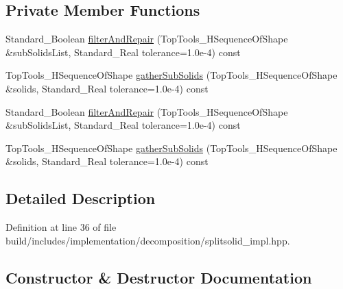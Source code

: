 \subsection*{Private Member Functions}
\begin{DoxyCompactItemize}
\item 
Standard\+\_\+\+Boolean \hyperlink{classMcCAD_1_1Decomposition_1_1SplitSolid_1_1Impl_ab12750fdedddaba9cbb2c953e82755da}{filter\+And\+Repair} (Top\+Tools\+\_\+\+H\+Sequence\+Of\+Shape \&sub\+Solids\+List, Standard\+\_\+\+Real tolerance=1.\+0e-\/4) const
\item 
Top\+Tools\+\_\+\+H\+Sequence\+Of\+Shape \hyperlink{classMcCAD_1_1Decomposition_1_1SplitSolid_1_1Impl_a18b18ada23d0b1c722679d7c30f1b391}{gather\+Sub\+Solids} (Top\+Tools\+\_\+\+H\+Sequence\+Of\+Shape \&solids, Standard\+\_\+\+Real tolerance=1.\+0e-\/4) const
\item 
Standard\+\_\+\+Boolean \hyperlink{classMcCAD_1_1Decomposition_1_1SplitSolid_1_1Impl_ab12750fdedddaba9cbb2c953e82755da}{filter\+And\+Repair} (Top\+Tools\+\_\+\+H\+Sequence\+Of\+Shape \&sub\+Solids\+List, Standard\+\_\+\+Real tolerance=1.\+0e-\/4) const
\item 
Top\+Tools\+\_\+\+H\+Sequence\+Of\+Shape \hyperlink{classMcCAD_1_1Decomposition_1_1SplitSolid_1_1Impl_a18b18ada23d0b1c722679d7c30f1b391}{gather\+Sub\+Solids} (Top\+Tools\+\_\+\+H\+Sequence\+Of\+Shape \&solids, Standard\+\_\+\+Real tolerance=1.\+0e-\/4) const
\end{DoxyCompactItemize}


\subsection{Detailed Description}


Definition at line 36 of file build/includes/implementation/decomposition/splitsolid\+\_\+impl.\+hpp.



\subsection{Constructor \& Destructor Documentation}
\mbox{\label{classMcCAD_1_1Decomposition_1_1SplitSolid_1_1Impl_a55f695ba13a95cfee799bf2c7d091602}} 
